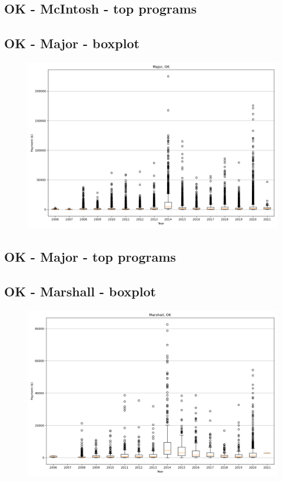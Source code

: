 \subsection*{OK - McIntosh - top programs}

\newpage
\subsection*{OK - Major - boxplot}
\begin{figure}[h]
\centering
\includegraphics[width=7in]{../output/boxplots/counties/Major-OK_boxplot.png}
\end{figure}


\subsection*{OK - Major - top programs}

\newpage
\subsection*{OK - Marshall - boxplot}
\begin{figure}[h]
\centering
\includegraphics[width=7in]{../output/boxplots/counties/Marshall-OK_boxplot.png}
\end{figure}


